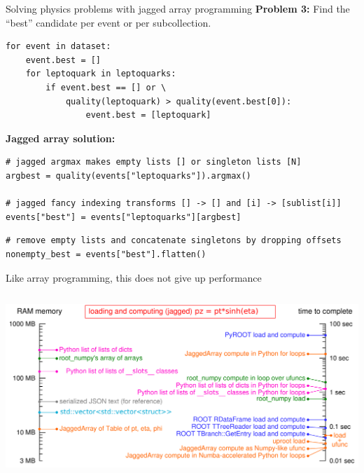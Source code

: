 \documentclass[aspectratio=169]{beamer}
\begin{document}
\begin{frame}[fragile]{Solving physics problems with jagged array programming}
\vspace{0.25 cm}
{\bf Problem 3:} Find the ``best'' candidate per event or per subcollection.
\small
\begin{verbatim}
for event in dataset:
    event.best = []
    for leptoquark in leptoquarks:
        if event.best == [] or \
            quality(leptoquark) > quality(event.best[0]):
                event.best = [leptoquark]
\end{verbatim}
\normalsize

\vspace{0.5 cm}
{\bf Jagged array solution:} 
\small
\begin{verbatim}
# jagged argmax makes empty lists [] or singleton lists [N]
argbest = quality(events["leptoquarks"]).argmax()

# jagged fancy indexing transforms [] -> [] and [i] -> [sublist[i]]
events["best"] = events["leptoquarks"][argbest]
\end{verbatim}

\vspace{0.05 cm}
\begin{verbatim}
# remove empty lists and concatenate singletons by dropping offsets
nonempty_best = events["best"].flatten()
\end{verbatim}
\end{frame}

\begin{frame}{Like array programming, this does not give up performance}
\vspace{0.3 cm}
\begin{columns}
\includegraphics[width=\linewidth]{logscales.pdf}
\end{columns}
\end{frame}
\end{document}
